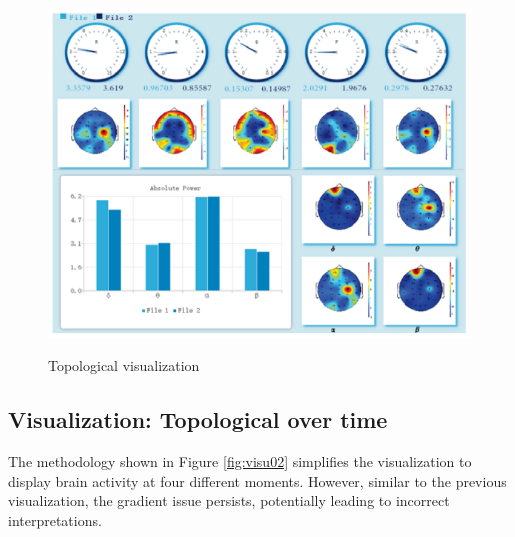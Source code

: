 \documentclass[format=sigconf]{acmart}
\begin{document}
			\begin{figure}[h]
				\centering
				\caption{Topological visualization}
				\includegraphics[width=\linewidth]{../presentation/images/visu01}
				\label{fig:visu01}
			\end{figure}
	
		\subsection{Visualization: Topological over time \cite{8937083}}
			\par The methodology shown in Figure \ref{fig:visu02} simplifies the visualization to display brain activity at four different moments. However, similar to the previous visualization, the gradient issue persists, potentially leading to incorrect interpretations.
			
\end{document}
